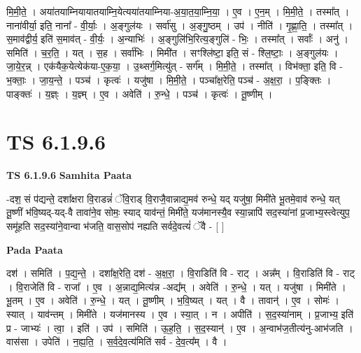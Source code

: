 \documentclass[17pt]{extarticle}
\begin{document}
मि॒मी॒ते॒ । अया॑तयाम्नियायातयाम्नि॒येत्यया॑तयाम्निया-अ॒या॒त॒या॒म्नि॒या॒ । ए॒व । ए॒न॒म् । मि॒मी॒ते॒ । तस्मा᳚त् । नाना॑वीर्या॒ इति॒ नाना᳚ - वी॒र्याः॒ । अ॒ङ्गुल॑यः । सर्वा॑सु । अ॒ङ्गु॒ष्ठम् । उप॑ । नीति॑ । गृ॒ह्णा॒ति॒ । तस्मा᳚त् । स॒माव॑द्वीर्य॒ इति॑ स॒माव॑त् - वी॒र्यः॒ । अ॒न्याभिः॑ । अ॒ङ्गुलि॑भि॒रित्य॒ङ्गुलि॑ - भिः॒ । तस्मा᳚त् । सर्वाः᳚ । अनु॑ । समिति॑ । च॒र॒ति॒ । यत् । स॒ह । सर्वा॑भिः । मिमी॑त । सꣳश्लि॑ष्टा॒ इति॒ सं - श्लि॒ष्टाः॒ । अ॒ङ्गुल॑यः । जा॒ये॒र॒न्न् । एक॑यैक॒येत्येक॑या-ए॒क॒या॒ । उ॒थ्सर्ग॒मित्यु॑त् - सर्ग᳚म् । मि॒मी॒ते॒ । तस्मा᳚त् । विभ॑क्ता॒ इति॒ वि - भ॒क्ताः॒ । जा॒य॒न्ते॒ । पञ्च॑ । कृत्वः॑ । यजु॑षा । मि॒मी॒ते॒ । पञ्चा᳚क्ष॒रेति॒ पञ्च॑ - अ॒क्ष॒रा॒ । प॒ङ्क्तिः । पाङ्क्तः॑ । य॒ज्ञ्ः । य॒ज्ञ्म् । ए॒व । अवेति॑ । रु॒न्धे॒ । पञ्च॑ । कृत्वः॑ । तू॒ष्णीम् ।  \newline





\section{ TS 6.1.9.6 }

\textbf{TS 6.1.9.6 } \newline
\textbf{Samhita Paata} \newline

-दश॒ सं प॑द्यन्ते॒ दशा᳚क्षरा वि॒राडन्नं॑ ॅवि॒राड् वि॒राजै॒वान्नाद्य॒मव॑ रुन्धे॒ यद् यजु॑षा॒ मिमी॑ते भू॒तमे॒वाव॑ रुन्धे॒ यत् तू॒ष्णीं भ॑वि॒ष्यद्-यद्-वै तावा॑ने॒व सोमः॒ स्याद् याव॑न्तं॒ मिमी॑ते॒ यज॑मानस्यै॒व स्या॒न्नापि॑ सद॒स्या॑नां प्र॒जाभ्य॒स्त्वेत्युप॒ समू॑हति सद॒स्या॑ने॒वान्वा भ॑जति॒ वास॒सोप॑ नह्यति सर्वदे॒वत्यं॑ ॅवै - [  ] \newline

\textbf{Pada Paata} \newline

दश॑ । समिति॑ । प॒द्य॒न्ते॒ । दशा᳚क्ष॒रेति॒ दश॑ - अ॒क्ष॒रा॒ । वि॒राडिति॑ वि - राट् । अन्न᳚म् । वि॒राडिति॑ वि - राट् । वि॒राजेति॑ वि - राजा᳚ । ए॒व । अ॒न्नाद्य॒मित्य॑न्न -अद्य᳚म् । अवेति॑ । रु॒न्धे॒ । यत् । यजु॑षा । मिमी॑ते । भू॒तम् । ए॒व । अवेति॑ । रु॒न्धे॒ । यत् । तू॒ष्णीम् । भ॒वि॒ष्यत् । यत् । वै । तावान्॑ । ए॒व । सोमः॑ । स्यात् । याव॑न्तम् । मिमी॑ते । यज॑मानस्य । ए॒व । स्या॒त् । न । अपीति॑ । स॒द॒स्या॑नाम् । प्र॒जाभ्य॒ इति॑ प्र - जाभ्यः॑ । त्वा॒ । इति॑ । उप॑ । समिति॑ । ऊ॒ह॒ति॒ । स॒द॒स्यान्॑ । ए॒व । अ॒न्वाभ॑ज॒तीत्य॑नु-आभ॑जति । वास॑सा । उपेति॑ । न॒ह्य॒ति॒ । स॒र्व॒दे॒व॒त्य॑मिति॑ सर्व - दे॒व॒त्य᳚म् । वै ।  \newline
\end{document}
